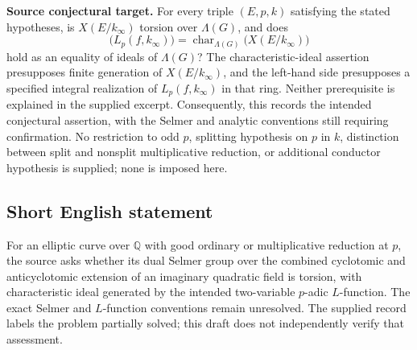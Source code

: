 \documentclass[11pt]{article}
\newcommand{\Q}{\mathbb{Q}}
\begin{document}
\textbf{Source conjectural target.} For every triple \((E,p,k)\) satisfying the stated hypotheses, is \(X(E/k_\infty)\) torsion over \(\Lambda(G)\), and does
\[
\bigl(L_p(f,k_\infty)\bigr)=\operatorname{char}_{\Lambda(G)}\!\bigl(X(E/k_\infty)\bigr)
\]
hold as an equality of ideals of \(\Lambda(G)\)? The characteristic-ideal assertion presupposes finite generation of \(X(E/k_\infty)\), and the left-hand side presupposes a specified integral realization of \(L_p(f,k_\infty)\) in that ring. Neither prerequisite is explained in the supplied excerpt. Consequently, this records the intended conjectural assertion, with the Selmer and analytic conventions still requiring confirmation. No restriction to odd \(p\), splitting hypothesis on \(p\) in \(k\), distinction between split and nonsplit multiplicative reduction, or additional conductor hypothesis is supplied; none is imposed here.
\subsection{Short English statement}
For an elliptic curve over \(\Q\) with good ordinary or multiplicative reduction at \(p\), the source asks whether its dual Selmer group over the combined cyclotomic and anticyclotomic extension of an imaginary quadratic field is torsion, with characteristic ideal generated by the intended two-variable \(p\)-adic \(L\)-function. The exact Selmer and \(L\)-function conventions remain unresolved. The supplied record labels the problem partially solved; this draft does not independently verify that assessment.
\end{document}
